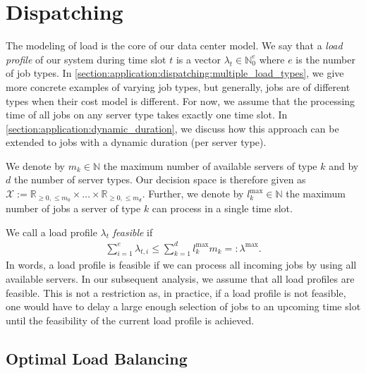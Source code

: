 \section{Dispatching}\label{section:application:dispatching}

The modeling of load is the core of our data center model. We say that a \emph{load profile} of our system during time slot $t$ is a vector $\lambda_t \in \mathbb{N}_0^e$ where $e$ is the number of job types. In \autoref{section:application:dispatching:multiple_load_types}, we give more concrete examples of varying job types, but generally, jobs are of different types when their cost model is different. For now, we assume that the processing time of all jobs on any server type takes exactly one time slot. In \autoref{section:application:dynamic_duration}, we discuss how this approach can be extended to jobs with a dynamic duration (per server type).

We denote by $m_k \in \mathbb{N}$ the maximum number of available servers of type $k$ and by $d$ the number of server types. Our decision space is therefore given as $\mathcal{X} := \mathbb{R}_{\geq 0, \leq m_0} \times \dots \times \mathbb{R}_{\geq 0, \leq m_d}$. Further, we denote by $l_k^{\text{max}} \in \mathbb{N}$ the maximum number of jobs a server of type $k$ can process in a single time slot.

We call a load profile $\lambda_t$ \emph{feasible} if \begin{align}
    \sum_{i=1}^e \lambda_{t,i} \leq \sum_{k=1}^d l_k^{\text{max}} m_k =: \lambda^{\text{max}}.
\label{eq:feasible_load_profiles}
\end{align} In words, a load profile is feasible if we can process all incoming jobs by using all available servers. In our subsequent analysis, we assume that all load profiles are feasible. This is not a restriction as, in practice, if a load profile is not feasible, one would have to delay a large enough selection of jobs to an upcoming time slot until the feasibility of the current load profile is achieved.

\subsection{Optimal Load Balancing}\label{section:application:dispatching:optimal_load_balancing}

